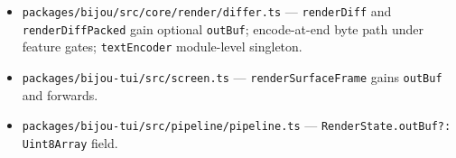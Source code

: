 \begin{itemize}
\tightlist
\item
  \texttt{p\allowbreak{}a\allowbreak{}c\allowbreak{}k\allowbreak{}a\allowbreak{}g\allowbreak{}e\allowbreak{}s\allowbreak{}/\allowbreak{}b\allowbreak{}i\allowbreak{}j\allowbreak{}o\allowbreak{}u\allowbreak{}/\allowbreak{}s\allowbreak{}r\allowbreak{}c\allowbreak{}/\allowbreak{}c\allowbreak{}o\allowbreak{}r\allowbreak{}e\allowbreak{}/\allowbreak{}r\allowbreak{}e\allowbreak{}n\allowbreak{}d\allowbreak{}e\allowbreak{}r\allowbreak{}/\allowbreak{}d\allowbreak{}i\allowbreak{}f\allowbreak{}f\allowbreak{}e\allowbreak{}r\allowbreak{}.\allowbreak{}t\allowbreak{}s} --- \texttt{r\allowbreak{}e\allowbreak{}n\allowbreak{}d\allowbreak{}e\allowbreak{}r\allowbreak{}D\allowbreak{}i\allowbreak{}f\allowbreak{}f} and \texttt{r\allowbreak{}e\allowbreak{}n\allowbreak{}d\allowbreak{}e\allowbreak{}r\allowbreak{}D\allowbreak{}i\allowbreak{}f\allowbreak{}f\allowbreak{}P\allowbreak{}a\allowbreak{}c\allowbreak{}k\allowbreak{}e\allowbreak{}d} gain optional \texttt{o\allowbreak{}u\allowbreak{}t\allowbreak{}B\allowbreak{}u\allowbreak{}f}; encode-at-end byte path under feature gates; \texttt{t\allowbreak{}e\allowbreak{}x\allowbreak{}t\allowbreak{}E\allowbreak{}n\allowbreak{}c\allowbreak{}o\allowbreak{}d\allowbreak{}e\allowbreak{}r} module-level singleton.
\item
  \texttt{p\allowbreak{}a\allowbreak{}c\allowbreak{}k\allowbreak{}a\allowbreak{}g\allowbreak{}e\allowbreak{}s\allowbreak{}/\allowbreak{}b\allowbreak{}i\allowbreak{}j\allowbreak{}o\allowbreak{}u\allowbreak{}-\allowbreak{}t\allowbreak{}u\allowbreak{}i\allowbreak{}/\allowbreak{}s\allowbreak{}r\allowbreak{}c\allowbreak{}/\allowbreak{}s\allowbreak{}c\allowbreak{}r\allowbreak{}e\allowbreak{}e\allowbreak{}n\allowbreak{}.\allowbreak{}t\allowbreak{}s} --- \texttt{r\allowbreak{}e\allowbreak{}n\allowbreak{}d\allowbreak{}e\allowbreak{}r\allowbreak{}S\allowbreak{}u\allowbreak{}r\allowbreak{}f\allowbreak{}a\allowbreak{}c\allowbreak{}e\allowbreak{}F\allowbreak{}r\allowbreak{}a\allowbreak{}m\allowbreak{}e} gains \texttt{o\allowbreak{}u\allowbreak{}t\allowbreak{}B\allowbreak{}u\allowbreak{}f} and forwards.
\item
  \texttt{p\allowbreak{}a\allowbreak{}c\allowbreak{}k\allowbreak{}a\allowbreak{}g\allowbreak{}e\allowbreak{}s\allowbreak{}/\allowbreak{}b\allowbreak{}i\allowbreak{}j\allowbreak{}o\allowbreak{}u\allowbreak{}-\allowbreak{}t\allowbreak{}u\allowbreak{}i\allowbreak{}/\allowbreak{}s\allowbreak{}r\allowbreak{}c\allowbreak{}/\allowbreak{}p\allowbreak{}i\allowbreak{}p\allowbreak{}e\allowbreak{}l\allowbreak{}i\allowbreak{}n\allowbreak{}e\allowbreak{}/\allowbreak{}p\allowbreak{}i\allowbreak{}p\allowbreak{}e\allowbreak{}l\allowbreak{}i\allowbreak{}n\allowbreak{}e\allowbreak{}.\allowbreak{}t\allowbreak{}s} --- \texttt{R\allowbreak{}e\allowbreak{}n\allowbreak{}d\allowbreak{}e\allowbreak{}r\allowbreak{}S\allowbreak{}t\allowbreak{}a\allowbreak{}t\allowbreak{}e\allowbreak{}.\allowbreak{}o\allowbreak{}u\allowbreak{}t\allowbreak{}B\allowbreak{}u\allowbreak{}f\allowbreak{}?\allowbreak{}:\allowbreak{} \allowbreak{}U\allowbreak{}i\allowbreak{}n\allowbreak{}t\allowbreak{}8\allowbreak{}A\allowbreak{}r\allowbreak{}r\allowbreak{}a\allowbreak{}y} field.

\end{itemize}
